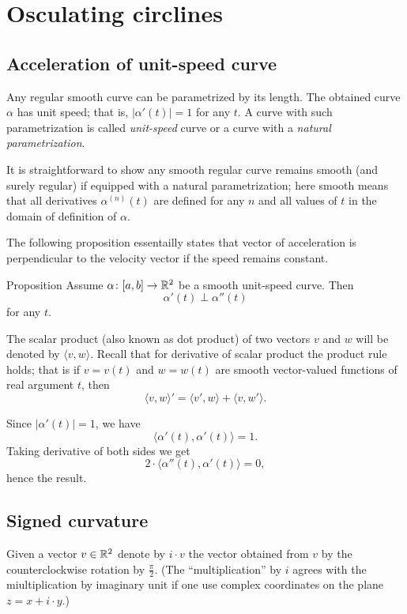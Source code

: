 \chapter{Osculating circlines}


\section{Acceleration of unit-speed curve}

Any regular smooth curve can be parametrized by its length.
The obtained curve $\alpha$ has unit speed; 
that is, $|\alpha'(t)|=1$ for any $t$.
A curve with such parametrization is called \emph{unit-speed} curve
or a curve with a \emph{natural parametrization}. 

It is straightforward to show any smooth regular curve remains smooth (and surely regular) if equipped with a natural parametrization; 
here smooth means that all derivatives $\alpha^{(n)}(t)$ are defined for any $n$ and all values of $t$ in the domain of definition of $\alpha$.

The following proposition essentailly states that vector of acceleration is perpendicular to the velocity vector if the speed remains constant.

\begin{thm}{Proposition}\label{prop:a'-pertp-a''}
Assume $\alpha\colon[a,b]\to\mathbb{R}^2$ be a smooth unit-speed curve.
Then 
\[\alpha'(t)\perp \alpha''(t)\]
for any $t$.
\end{thm}

The scalar product (also known as dot product) of two vectors $v$ and $w$ will be denoted by $\langle v,w\rangle$.
Recall that for derivative of scalar product the product rule holds;
that is if $v=v(t)$ and $w=w(t)$ are smooth vector-valued functions of real argument $t$, then
\[\langle v,w\rangle'=\langle v',w\rangle+\langle v,w'\rangle.\]

Since $|\alpha'(t)|=1$, we have
\[\langle\alpha'(t),\alpha'(t)\rangle=1.\]
Taking derivative of both sides we get
\[2\cdot\langle\alpha''(t),\alpha'(t)\rangle=0,\]
hence the result.
\qeds

\section{Signed curvature}

Given a vector $v\in \mathbb{R}^2$ denote by $i\cdot v$ the vector obtained from $v$ by the counterclockwise rotation by $\tfrac\pi2$.
(The ``multiplication'' by $i$ agrees with the miultiplication by imaginary unit if one use  complex coordinates on the plane $z=x+i\cdot y$.)

